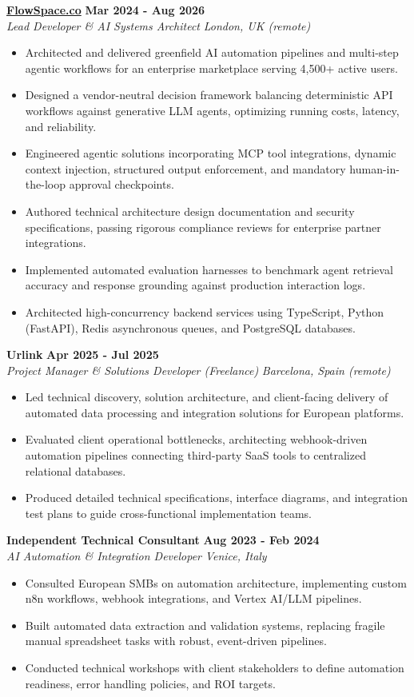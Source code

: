 \documentclass[10pt,a4paper]{article}
\newcommand{\role}[4]{%
  \textbf{#1} \hfill \textbf{#2}\\[1pt]%
  \textit{#3} \hfill \textit{#4}\\[2pt]%
}
\begin{document}
\role{\href{https://flowspace.co}{FlowSpace.co}}{Mar 2024 - Aug 2026}{Lead Developer \& AI Systems Architect}{London, UK (remote)}
\begin{itemize}
  \item Architected and delivered greenfield AI automation pipelines and multi-step agentic workflows for an enterprise marketplace serving 4,500+ active users.
  \item Designed a vendor-neutral decision framework balancing deterministic API workflows against generative LLM agents, optimizing running costs, latency, and reliability.
  \item Engineered agentic solutions incorporating MCP tool integrations, dynamic context injection, structured output enforcement, and mandatory human-in-the-loop approval checkpoints.
  \item Authored technical architecture design documentation and security specifications, passing rigorous compliance reviews for enterprise partner integrations.
  \item Implemented automated evaluation harnesses to benchmark agent retrieval accuracy and response grounding against production interaction logs.
  \item Architected high-concurrency backend services using TypeScript, Python (FastAPI), Redis asynchronous queues, and PostgreSQL databases.
\end{itemize}

\role{Urlink}{Apr 2025 - Jul 2025}{Project Manager \& Solutions Developer (Freelance)}{Barcelona, Spain (remote)}
\begin{itemize}
  \item Led technical discovery, solution architecture, and client-facing delivery of automated data processing and integration solutions for European platforms.
  \item Evaluated client operational bottlenecks, architecting webhook-driven automation pipelines connecting third-party SaaS tools to centralized relational databases.
  \item Produced detailed technical specifications, interface diagrams, and integration test plans to guide cross-functional implementation teams.
\end{itemize}

\role{Independent Technical Consultant}{Aug 2023 - Feb 2024}{AI Automation \& Integration Developer}{Venice, Italy}
\begin{itemize}
  \item Consulted European SMBs on automation architecture, implementing custom n8n workflows, webhook integrations, and Vertex AI/LLM pipelines.
  \item Built automated data extraction and validation systems, replacing fragile manual spreadsheet tasks with robust, event-driven pipelines.
  \item Conducted technical workshops with client stakeholders to define automation readiness, error handling policies, and ROI targets.
\end{itemize}
\end{document}

